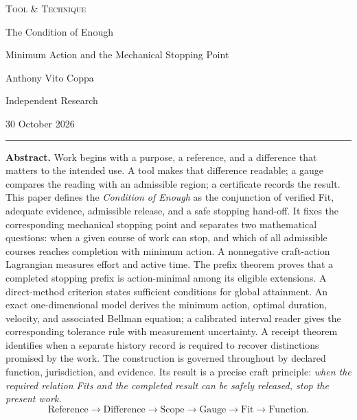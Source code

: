 \documentclass[11pt,letterpaper]{article}
\theoremstyle{definition}\newtheorem{definition}{Definition}
\begin{document}
\begin{center}
{\fontsize{17}{20}\selectfont\scshape Tool \& Technique}\par
\vspace{0.2em}
{\fontsize{12.5}{15}\selectfont The Condition of Enough}\par
\vspace{0.12em}
{\normalsize Minimum Action and the Mechanical Stopping Point}\par
\vspace{0.65em}
{\normalsize Anthony Vito Coppa}\par
{\small Independent Research}\par
{\small 30 October 2026}
\end{center}
\vspace{0.15em}\hrule\vspace{0.44em}
\noindent\textbf{Abstract.}
Work begins with a purpose, a reference, and a difference that matters to the intended use. A tool makes that difference readable; a gauge compares the reading with an admissible region; a certificate records the result. This paper defines the \emph{Condition of Enough} as the conjunction of verified Fit, adequate evidence, admissible release, and a safe stopping hand-off. It fixes the corresponding mechanical stopping point and separates two mathematical questions: when a given course of work can stop, and which of all admissible courses reaches completion with minimum action. A nonnegative craft-action Lagrangian measures effort and active time. The prefix theorem proves that a completed stopping prefix is action-minimal among its eligible extensions. A direct-method criterion states sufficient conditions for global attainment. An exact one-dimensional model derives the minimum action, optimal duration, velocity, and associated Bellman equation; a calibrated interval reader gives the corresponding tolerance rule with measurement uncertainty. A receipt theorem identifies when a separate history record is required to recover distinctions promised by the work. The construction is governed throughout by declared function, jurisdiction, and evidence. Its result is a precise craft principle: \emph{when the required relation Fits and the completed result can be safely released, stop the present work.}
\begin{equation}\label{eq:spine}
\boxed{\text{Reference}\longrightarrow\text{Difference}\longrightarrow\text{Scope}
\longrightarrow\text{Gauge}\longrightarrow\text{Fit}\longrightarrow\text{Function}.}
\end{equation}
\end{document}
